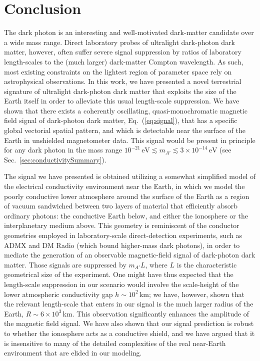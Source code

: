 \documentclass[amsmath,amssymb,aps,10pt,prd,letterpaper,nofootinbib,balancelastpage,notitlepage,superscriptaddress,twocolumn,floatfix]{revtex4-2}
\newcommand{\secref}[2][]{Sec{#1}.~\ref{#2}}		%
\renewcommand{\eqref}[2][]{Eq{#1}.~(\ref{eq:#2})}	%
\begin{document}
\section{Conclusion}
\label{sec:conclusion}

The dark photon is an interesting and well-motivated dark-matter candidate over a wide mass range.
Direct laboratory probes of ultralight dark-photon dark matter, however, often suffer severe signal suppression by ratios of laboratory length-scales to the (much larger) dark-matter Compton wavelength. 
As such, most existing constraints on the lightest region of parameter space rely on astrophysical observations.
In this work, we have presented a novel terrestrial signature of ultralight dark-photon dark matter that exploits the size of the Earth itself in order to alleviate this usual length-scale suppression.
We have shown that there exists a coherently oscillating, quasi-monochromatic magnetic field signal of dark-photon dark matter, \eqref{signal}, that has a specific global vectorial spatial pattern, and which is detectable near the surface of the Earth in unshielded magnetometer data. 
This signal would be present in principle for any dark photon in the mass range $10^{-21}\,\text{eV}\lesssim m_{A'}\lesssim 3\times 10^{-14}\,\text{eV}$ (see \secref{sec:conductivitySummary}).

The signal we have presented is obtained utilizing a somewhat simplified model of the electrical conductivity environment near the Earth, in which we model the poorly conductive lower atmosphere around the surface of the Earth as a region of vacuum sandwiched between two layers of material that efficiently absorb ordinary photons: the conductive Earth below, and either the ionosphere or the interplanetary medium above.
This geometry is reminiscent of the conductor geometries employed in laboratory-scale direct-detection experiments, such as ADMX and DM Radio (which bound higher-mass dark photons), in order to mediate the generation of an observable magnetic-field signal of dark-photon dark matter.
Those signals are suppressed by $m_{A'}L$, where $L$ is the characteristic geometrical size of the experiment.
One might have thus expected that the length-scale suppression in our scenario would involve the scale-height of the lower atmospheric conductivity gap $h \sim 10^2$\,km; we have, however, shown that the relevant length-scale that enters in our signal is the much larger radius of the Earth, $R \sim 6\times 10^3$\,km.
This observation significantly enhances the amplitude of the magnetic field signal.
We have also shown that our signal prediction is robust to whether the ionosphere acts as a conductive shield, and we have argued that it is insensitive to many of the detailed complexities of the real near-Earth environment that are elided in our modeling.
\end{document}
